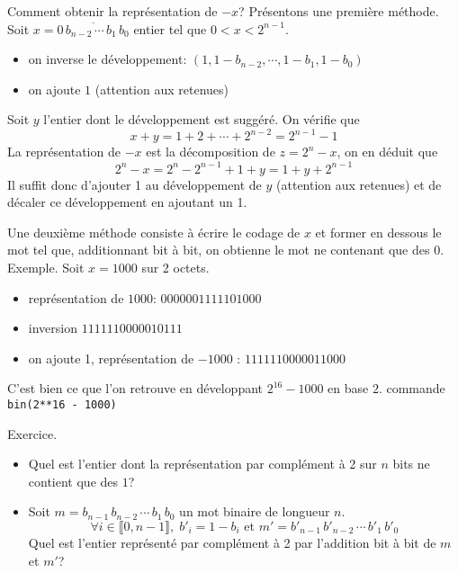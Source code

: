 Comment obtenir la représentation de $-x$? Présentons une première méthode.\newline
Soit $x = \overline{0\,b_{n-2}\,\cdots\, b_1\, b_0}$ entier tel que $0<x<2^{n-1}$.  
\begin{itemize}
  \item on inverse le développement: $(1,1-b_{n-2},\cdots,1-b_1,1-b_0)$
  \item on ajoute $1$ (attention aux retenues)
\end{itemize}
\begin{demo}
 Soit $y$ l'entier dont le développement est suggéré. On vérifie que
\begin{displaymath}
 x+y = 1+2+\cdots+2^{n-2} = 2^{n-1}-1
\end{displaymath}
La représentation de $-x$ est la décomposition de $z = 2^{n}-x$, on en déduit que
\begin{displaymath}
 2^{n}-x = 2^{n} - 2^{n-1} + 1 +y=1+y+2^{n-1}
\end{displaymath}
Il suffit donc d'ajouter 1 au développement de $y$ (attention aux retenues) et de décaler ce développement en ajoutant un 1.\newline  
\end{demo}
Une deuxième méthode consiste à écrire le codage de $x$ et former en dessous le mot tel que, additionnant bit à bit, on obtienne le mot ne contenant que des $0$.
Exemple. Soit $x=1000$ sur 2 octets.
\begin{itemize}
  \item représentation de $1000$: $0000001111101000$
  \item inversion $1111110000010111$
  \item on ajoute 1, représentation de $-1000$ : $1111110000011000$ 
\end{itemize}
C'est bien ce que l'on retrouve en développant $2^{16}-1000$ en base $2$.\newline
commande \texttt{bin(2**16 - 1000)}

Exercice.
\begin{itemize}
  \item Quel est l'entier dont la représentation par complément à 2 sur $n$ bits ne contient que des $1$?
  \item Soit $m = b_{n-1}\,b_{n-2}\,\cdots\,b_1\,b_0$ un mot binaire de longueur $n$.
\begin{displaymath}
  \forall i\in \llbracket 0,n-1\rrbracket, \; b'_i = 1-b_i \text{ et } m' = b'_{n-1}\,b'_{n-2}\,\cdots\,b'_1\,b'_0
\end{displaymath}
  Quel est l'entier représenté par complément à 2 par l'addition bit à bit de $m$ et $m'$? 
\end{itemize}


